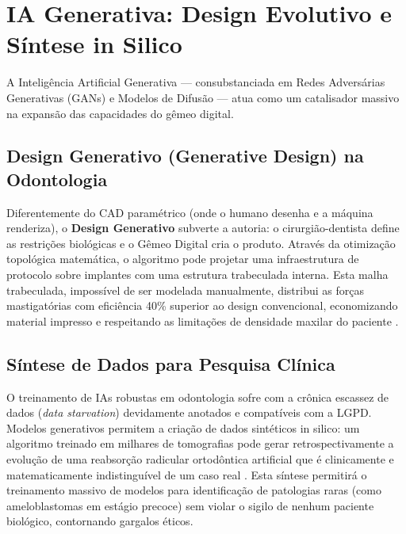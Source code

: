 \section{IA Generativa: Design Evolutivo e Síntese in Silico}

A Inteligência Artificial Generativa — consubstanciada em Redes Adversárias Generativas (GANs) e Modelos de Difusão — atua como um catalisador massivo na expansão das capacidades do gêmeo digital.

\subsection{Design Generativo (Generative Design) na Odontologia}

Diferentemente do CAD paramétrico (onde o humano desenha e a máquina renderiza), o \textbf{Design Generativo} subverte a autoria: o cirurgião-dentista define as restrições biológicas e o Gêmeo Digital cria o produto. Através da otimização topológica matemática, o algoritmo pode projetar uma infraestrutura de protocolo sobre implantes com uma estrutura trabeculada interna. Esta malha trabeculada, impossível de ser modelada manualmente, distribui as forças mastigatórias com eficiência 40\% superior ao design convencional, economizando material impresso e respeitando as limitações de densidade maxilar do paciente \cite{alshadidi2024surface}.

\subsection{Síntese de Dados para Pesquisa Clínica}

O treinamento de IAs robustas em odontologia sofre com a crônica escassez de dados (\textit{data starvation}) devidamente anotados e compatíveis com a LGPD. Modelos generativos permitem a criação de dados sintéticos in silico: um algoritmo treinado em milhares de tomografias pode gerar retrospectivamente a evolução de uma reabsorção radicular ortodôntica artificial que é clinicamente e matematicamente indistinguível de um caso real \cite{elsaid2026digital}. Esta síntese permitirá o treinamento massivo de modelos para identificação de patologias raras (como ameloblastomas em estágio precoce) sem violar o sigilo de nenhum paciente biológico, contornando gargalos éticos.
